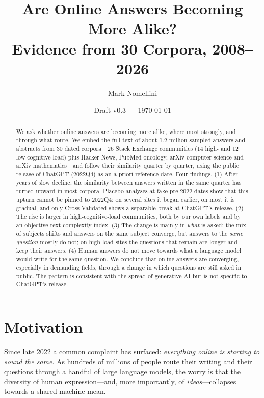 \documentclass[11pt]{article}
\title{Are Online Answers Becoming More Alike?\\[4pt]
  \large Evidence from 30 Corpora, 2008--2026}
\author{Mark Nomellini}
\date{Draft v0.3 --- \today}
\begin{document}
\maketitle

\begin{abstract}
We ask whether online answers are becoming more alike, where most strongly, and through what route.
We embed the full text of about 1.2 million sampled answers and abstracts from 30 dated
corpora---26 Stack Exchange communities (14 high- and 12 low-cognitive-load) plus Hacker News,
PubMed oncology, arXiv computer science and arXiv mathematics---and follow their similarity quarter
by quarter, using the public release of ChatGPT (2022Q4) as an a-priori reference date. Four
findings. (1) After years of slow decline, the similarity between answers written in the same quarter
has turned upward in most corpora. Placebo analyses at fake pre-2022 dates show that this upturn
cannot be pinned to 2022Q4: on several sites it began earlier, on most it is gradual, and only Cross
Validated shows a separable break at ChatGPT's release. (2) The rise is larger in
high-cognitive-load communities, both by our own labels and by an objective text-complexity index.
(3) The change is mainly in \emph{what} is asked: the mix of subjects shifts and answers on the same
subject converge, but answers to the \emph{same question} mostly do not; on high-load sites the
questions that remain are longer and keep their answers. (4) Human answers do not move towards what
a language model would write for the same question. We conclude that online answers are converging,
especially in demanding fields, through a change in which questions are still asked in public. The
pattern is consistent with the spread of generative AI but is not specific to ChatGPT's release.
\end{abstract}

\section{Motivation}

Since late 2022 a common complaint has surfaced: \emph{everything online is starting to sound the
same}. As hundreds of millions of people route their writing and their questions through a handful
of large language models, the worry is that the diversity of human expression---and, more
importantly, of \emph{ideas}---collapses towards a shared machine mean.
\end{document}
